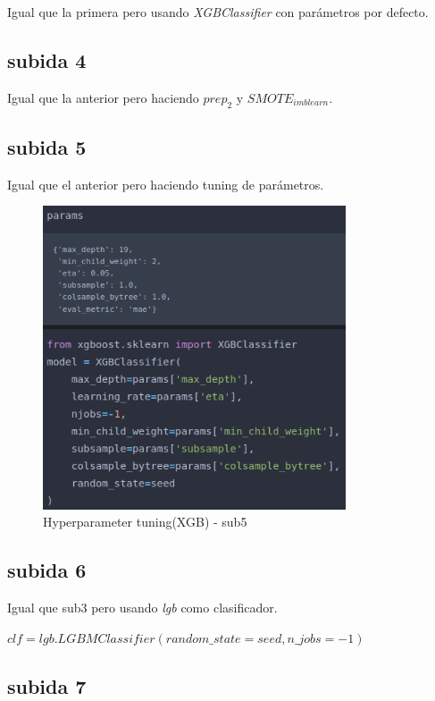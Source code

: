 Igual que la primera pero usando \textit{XGBClassifier} con parámetros por defecto.

\subsection{subida 4}

Igual que la anterior pero haciendo $prep_{2}$ y $SMOTE_{imblearn}$.

\subsection{subida 5}

Igual que el anterior pero haciendo tuning de parámetros.

\begin{figure}[H]
\centering
\includegraphics[width=0.8\textwidth]{imagenes/sub5.png}
\caption{Hyperparameter tuning(XGB) - sub5}
\end{figure}

\subsection{subida 6}

Igual que sub3 pero usando \textit{lgb} como clasificador.

$clf = lgb.LGBMClassifier(random\_state=seed, n\_jobs=-1)$

\subsection{subida 7}

